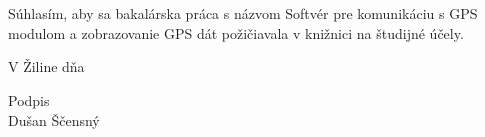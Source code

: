 \chapter*{}
\thispagestyle{empty}
\vspace{4cm}
Súhlasím, aby sa bakalárska práca s názvom Softvér pre komunikáciu s GPS modulom a zobrazovanie GPS dát požičiavala v knižnici na študijné účely.


\vspace{10cm}
\noindent
V Žiline dňa \makebox[8em]{\dotfill} 
\begin{flushright}
\hfill Podpis\makebox[8em]{\dotfill}\\
\hfill Dušan Ščensný 
\end{flushright}

